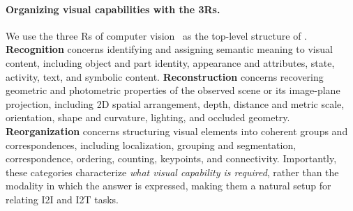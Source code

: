 \paragraph{Organizing visual capabilities with the 3Rs.}
We use the three Rs of computer vision~\citep{malik2016three} as the top-level structure of \methodname.
\textbf{Recognition} concerns identifying and assigning semantic meaning to visual content, including object and part identity, appearance and attributes, state, activity, text, and symbolic content.
\textbf{Reconstruction} concerns recovering geometric and photometric properties of the observed scene or its image-plane projection, including 2D spatial arrangement, depth, distance and metric scale, orientation, shape and curvature, lighting, and occluded geometry.
\textbf{Reorganization} concerns structuring visual elements into coherent groups and correspondences, including localization, grouping and segmentation, correspondence, ordering, counting, keypoints, and connectivity.
Importantly, these categories characterize \emph{what visual capability is required}, rather than the modality in which the answer is expressed, making them a natural setup for relating I2I and I2T tasks.
